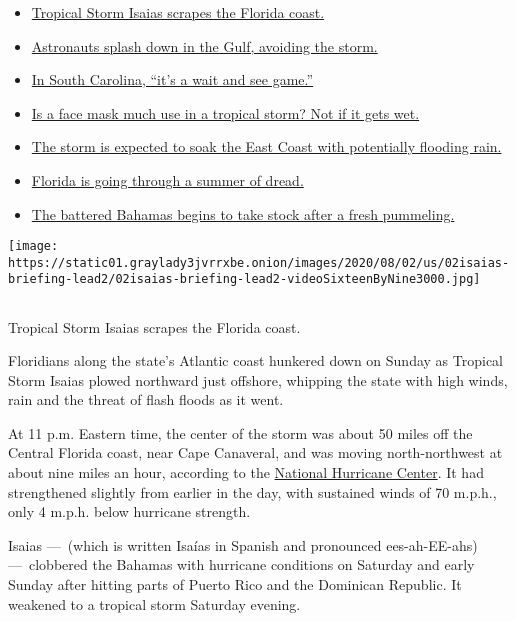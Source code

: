 \begin{itemize}
\tightlist
\item
  \protect\hyperlink{link-6002fe80}{Tropical Storm Isaias scrapes the
  Florida coast.}
\item
  \protect\hyperlink{link-301f2153}{Astronauts splash down in the Gulf,
  avoiding the storm.}
\item
  \protect\hyperlink{link-17739c9a}{In South Carolina, ``it's a wait and
  see game.''}
\item
  \protect\hyperlink{link-e77dd06}{Is a face mask much use in a tropical
  storm? Not if it gets wet.}
\item
  \protect\hyperlink{link-6f11f4a6}{The storm is expected to soak the
  East Coast with potentially flooding rain.}
\item
  \protect\hyperlink{link-3c28a89f}{Florida is going through a summer of
  dread.}
\item
  \protect\hyperlink{link-2d06f1e8}{The battered Bahamas begins to take
  stock after a fresh pummeling.}
\end{itemize}

\texttt{[image: https://static01.graylady3jvrrxbe.onion/images/2020/08/02/us/02isaias-briefing-lead2/02isaias-briefing-lead2-videoSixteenByNine3000.jpg]}

\subsection{}

Tropical Storm Isaias scrapes the Florida coast.

Floridians along the state's Atlantic coast hunkered down on Sunday as
Tropical Storm Isaias plowed northward just offshore, whipping the state
with high winds, rain and the threat of flash floods as it went.

At 11 p.m. Eastern time, the center of the storm was about 50 miles off
the Central Florida coast, near Cape Canaveral, and was moving
north-northwest at about nine miles an hour, according to the
\href{https://www.nhc.noaa.gov/text/refresh/MIATCPAT4+shtml/020856.shtml?}{National
Hurricane Center}. It had strengthened slightly from earlier in the day,
with sustained winds of 70 m.p.h., only 4 m.p.h. below hurricane
strength.

Isaias ---~(which is written Isaías in Spanish and pronounced
ees-ah-EE-ahs) ---~clobbered the Bahamas with hurricane conditions on
Saturday and early Sunday after hitting parts of Puerto Rico and the
Dominican Republic. It weakened to a tropical storm Saturday evening.

